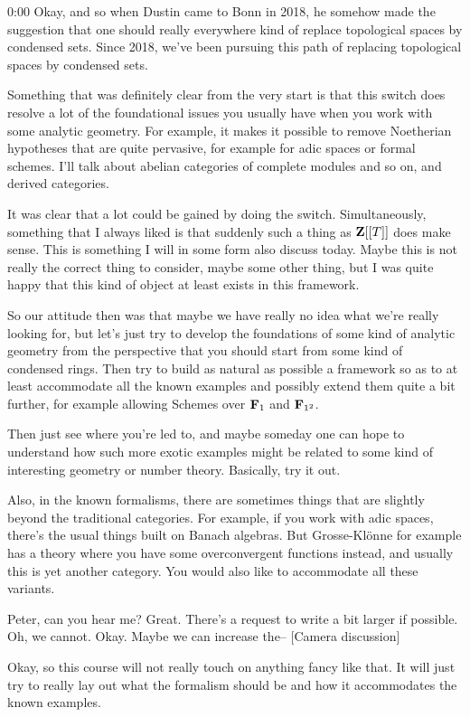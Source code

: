 \begin{unfinished}{0:00}
Okay, and so when Dustin came to Bonn in 2018, he somehow made the suggestion that one should really everywhere kind of replace topological spaces by condensed sets. Since 2018, we've been pursuing this path of replacing topological spaces by condensed sets.

Something that was definitely clear from the very start is that this switch does resolve a lot of the foundational issues you usually have when you work with some analytic geometry. For example, it makes it possible to remove Noetherian hypotheses that are quite pervasive, for example for adic spaces or formal schemes. I'll talk about abelian categories of complete modules and so on, and derived categories.

It was clear that a lot could be gained by doing the switch. Simultaneously, something that I always liked is that suddenly such a thing as $\mathbf Z[[T]]$ does make sense. This is something I will in some form also discuss today. Maybe this is not really the correct thing to consider, maybe some other thing, but I was quite happy that this kind of object at least exists in this framework.

So our attitude then was that maybe we have really no idea what we're really looking for, but let's just try to develop the foundations of some kind of analytic geometry from the perspective that you should start from some kind of condensed rings. Then try to build as natural as possible a framework so as to at least accommodate all the known examples and possibly extend them quite a bit further, for example allowing Schemes over $\mathbf F_1$ and $\mathbf F_{1^2}$.

Then just see where you're led to, and maybe someday one can hope to understand how such more exotic examples might be related to some kind of interesting geometry or number theory. Basically, try it out.

Also, in the known formalisms, there are sometimes things that are slightly beyond the traditional categories. For example, if you work with adic spaces, there's the usual things built on Banach algebras. But Grosse-Klönne for example has a theory where you have some overconvergent functions instead, and usually this is yet another category. You would also like to accommodate all these variants.

Peter, can you hear me? Great. There's a request to write a bit larger if possible. Oh, we cannot. Okay. Maybe we can increase the-- [Camera discussion]

Okay, so this course will not really touch on anything fancy like that. It will just try to really lay out what the formalism should be and how it accommodates the known examples.


\end{unfinished}
